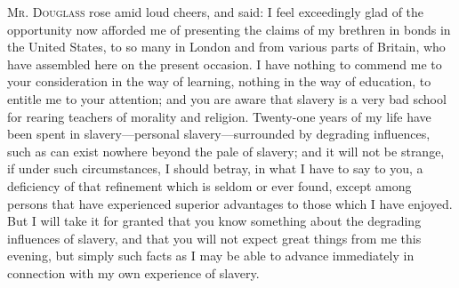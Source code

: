 \textsc{Mr. Douglass} rose amid loud cheers, and said: I feel
exceedingly glad of the opportunity now afforded me of presenting the
claims of my brethren in bonds in the United States, to so many in
London and from various parts of Britain, who have assembled here on the
present occasion. I have nothing to commend me to your consideration in
the way of learning, nothing in the way of education, to entitle me to
your attention; and you are aware that slavery is a very bad school for
rearing teachers of morality and religion. Twenty-one years of my life
have been spent in slavery---personal slavery---surrounded by degrading
influences, such as can exist nowhere beyond the pale of slavery; and it
will not be strange, if under such circumstances, I should betray, in
what I have to say to you, a deficiency of that refinement which is
seldom or ever found, except among persons that have experienced
superior advantages to those which I have enjoyed. But I will take it
for granted that you know something about the degrading influences of
slavery, and that you will not expect great things from me this evening,
but simply such facts as I may be able to advance immediately in
connection with my own experience of slavery.

